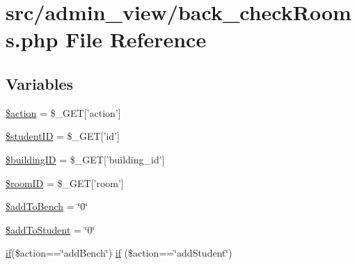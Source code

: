 \hypertarget{back__checkRooms_8php}{\section{src/admin\-\_\-view/back\-\_\-check\-Rooms.php \-File \-Reference}
\label{back__checkRooms_8php}
}
\subsection*{\-Variables}
\begin{DoxyCompactItemize}
\item 
\hyperlink{back__checkRooms_8php_aa698a3e72116e8e778be0e95d908ee30}{\$action} = \$\-\_\-\-G\-E\-T\mbox{[}'action'\mbox{]}
\item 
\hyperlink{back__checkRooms_8php_af62eac6f1a6ea66c9f90093940147945}{\$student\-I\-D} = \$\-\_\-\-G\-E\-T\mbox{[}'id'\mbox{]}
\item 
\hyperlink{back__checkRooms_8php_acfaa0ff73c631ce07c4851ed12fcd83d}{\$building\-I\-D} = \$\-\_\-\-G\-E\-T\mbox{[}'building\-\_\-id'\mbox{]}
\item 
\hyperlink{back__checkRooms_8php_a61034568ba6e795a925d00afa98d3797}{\$room\-I\-D} = \$\-\_\-\-G\-E\-T\mbox{[}'room'\mbox{]}
\item 
\hyperlink{back__checkRooms_8php_a203f48bd509ef90819599e761f574023}{\$add\-To\-Bench} = \char`\"{}0\char`\"{}
\item 
\hyperlink{back__checkRooms_8php_ab8b532875ded9bdf4075f627ddf2fa78}{\$add\-To\-Student} = \char`\"{}0\char`\"{}
\item 
\hyperlink{updateBenchDB_8php_a0c1f2915e12defa9f4d515347d884dee}{if}(\$action==\char`\"{}add\-Bench\char`\"{}) \hyperlink{back__checkRooms_8php_a8e6545ce0238da2ec377455ff693414e}{if} (\$action==\char`\"{}add\-Student\char`\"{})
\end{DoxyCompactItemize}


